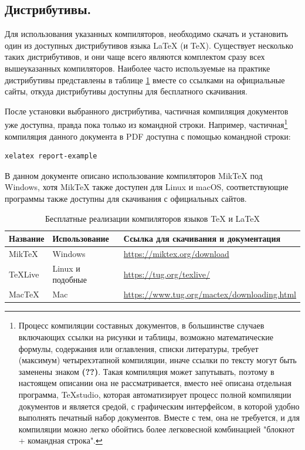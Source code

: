 \documentclass[report, draught]{fefudoc}
\begin{document}
\subsection{Дистрибутивы.}\label{раздел про дистрибутивы}
Для использования указанных компиляторов, необходимо скачать и установить один из доступных дистрибутивов языка \LaTeX{} (и \TeX{}).
Существует несколько таких дистрибутивов, и они чаще всего являются комплектом сразу всех вышеуказанных компиляторов.
Наиболее часто используемые на практике дистрибутивы представлены в таблице \ref{таблица дистрибутивов} вместе со ссылками на официальные сайты, откуда дистрибутивы доступны для бесплатного скачивания.

После установки выбранного дистрибутива, частичная компиляция документов уже доступна, правда пока только из командной строки.
Например,
частичная\footnote{Процесс компиляции составных документов, в большинстве случаев включающих ссылки на рисунки и таблицы, возможно математические формулы, содержания или оглавления, списки литературы, требует (максимум) четырехэтапной компиляции, иначе ссылки по тексту могут быть заменены знаком \textbf{(??)}. Такая компиляция может запутывать, поэтому в настоящем описании она не рассматривается, вместо неё описана отдельная программа, TeXstudio, которая автоматизирует процесс полной компиляции документов и является средой, с графическим интерфейсом, в которой удобно выполнять печатный набор документов. Вместе с тем, она не требуется, и для компиляции можно легко обойтись более легковесной комбинацией "блокнот + командная строка".}
компиляция данного документа в PDF доступна с помощью командной строки:
\begin{lstlisting}
xelatex report-example
\end{lstlisting}

В данном документе описано использование компиляторов MikTeX под Windows, хотя MikTeX также доступен для Linux и macOS, соответствующие программы также доступны для скачивания с официальных сайтов.

\begin{table}[ht]
\centering
\caption{Бесплатные реализации компиляторов языков \TeX{} и \LaTeX{}}
\label{таблица дистрибутивов}
\begin{tabularx}{\textwidth}{|l|l|X|}
\hline
\textbf{Название} & \textbf{Использование} & \textbf{Ссылка для скачивания и документация}     \\ \hline
MikTeX            & Windows                & \url{https://miktex.org/download}                 \\ \hline
TeXLive           & Linux и подобные       & \url{https://tug.org/texlive/}                    \\ \hline
MacTeX            & Mac                    & \url{https://www.tug.org/mactex/downloading.html} \\ \hline
\end{tabularx}
\end{table}
\end{document}
